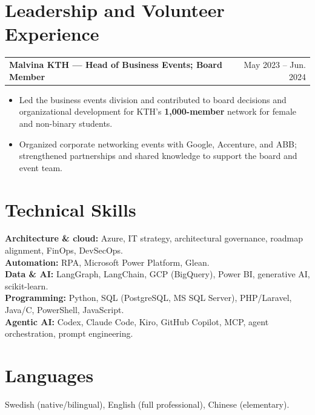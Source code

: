 \documentclass{ExpressiveResume}
\makeatletter
\newcommand{\resumeentry}[3]{%
    \par\addvspace{3pt}\Needspace{3\baselineskip}%
    \noindent\begin{tabularx}{\linewidth}{@{}X r@{}}
        \textbf{#1 --- #2} & {\small #3}
    \end{tabularx}\par
}
\renewcommand{\achievement}[1]{%
    \begin{itemize}\item #1\end{itemize}\vspace{1pt}%
}
\makeatother
\begin{document}
\section{Leadership and Volunteer Experience}
\resumeentry{Malvina KTH}{Head of Business Events; Board Member}{May 2023 -- Jun. 2024}
\achievement{Led the business events division and contributed to board decisions
and organizational development for KTH's \textbf{1,000-member} network for female
and non-binary students.}
\achievement{Organized corporate networking events with Google, Accenture, and ABB;
strengthened partnerships and shared knowledge to support the board and event team.}

\section{Technical Skills}
\textbf{Architecture \& cloud:} Azure, IT strategy, architectural governance, roadmap alignment, FinOps, DevSecOps.\\[1pt]
\textbf{Automation:} RPA, Microsoft Power Platform, Glean.\\[1pt]
\textbf{Data \& AI:} LangGraph, LangChain, GCP (BigQuery), Power BI, generative AI, scikit-learn.\\[1pt]
\textbf{Programming:} Python, SQL (PostgreSQL, MS SQL Server), PHP/Laravel, Java/C, PowerShell, JavaScript.\\[1pt]
\textbf{Agentic AI:} Codex, Claude Code, Kiro, GitHub Copilot, MCP, agent orchestration, prompt engineering.

\section{Languages}
Swedish (native/bilingual), English (full professional), Chinese (elementary).
\end{document}
